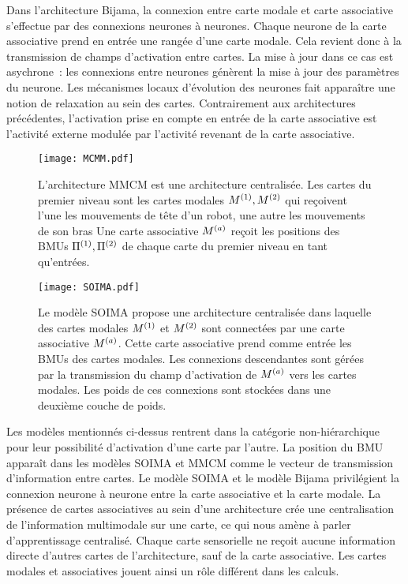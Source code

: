 \documentclass[../main]{subfiles}
\begin{document}
Dans l'architecture Bijama, la connexion entre carte modale et carte associative s'effectue par des connexions neurones à neurones. Chaque neurone de la carte associative prend en entrée une rangée d'une carte modale. Cela revient donc à la transmission de champs d'activation entre cartes.
La mise à jour dans ce cas est asychrone~: les connexions entre neurones génèrent la mise à jour des paramètres du neurone. Les mécanismes locaux d'évolution des neurones fait apparaître une notion de relaxation au sein des cartes. 
Contrairement aux architectures précédentes, l'activation prise en compte en entrée de la carte associative est l'activité externe modulée par l'activité revenant de la carte associative.

\begin{figure}[t]
    \centering
    \texttt{[image: MCMM.pdf]}
    \caption{L'architecture MMCM \cite{dominey13} est une architecture centralisée.
    Les cartes du premier niveau sont les cartes modales $M^{({1})}, M^{({2})}$ qui reçoivent l'une les mouvements de tête d'un robot, une autre les mouvements de son bras
    Une carte associative $M^{({a})}$ reçoit les positions des BMUs $\Pi^{({1})},\Pi^{({2})}$ de chaque carte du premier niveau en tant qu'entrées. 
    \label{fig:mmcm}}
\end{figure}

\begin{figure}[t]
    \centering
    \texttt{[image: SOIMA.pdf]}
    \caption{Le modèle SOIMA \cite{escobar-juarez_self-organized_2016} propose une architecture centralisée dans laquelle des cartes modales $M^{({1})}$ et $M^{({2})}$ sont connectées par une carte associative $M^{({a})}$. Cette carte associative prend comme entrée les BMUs des cartes modales. 
    Les connexions descendantes sont gérées par la transmission du champ d'activation de $M^{({a})}$ vers les cartes modales. Les poids de ces connexions sont stockées dans une deuxième couche de poids.
    \label{fig:SOIMA}}
\end{figure}

Les modèles mentionnés ci-dessus rentrent dans la catégorie non-hiérarchique pour leur possibilité d'activation d'une carte par l'autre. 
La position du BMU apparaît dans les modèles SOIMA et MMCM comme le vecteur de transmission d'information  entre cartes.
Le modèle SOIMA et le modèle Bijama privilégient la connexion neurone à neurone entre la carte associative et la carte modale.
La présence de cartes associatives au sein d'une architecture crée une centralisation de l'information multimodale sur une carte, ce qui nous amène à parler d'apprentissage centralisé. Chaque carte sensorielle ne reçoit aucune information directe d'autres cartes de l'architecture, sauf de la carte associative.
Les cartes modales et associatives jouent ainsi un rôle différent dans les calculs.
\end{document}
